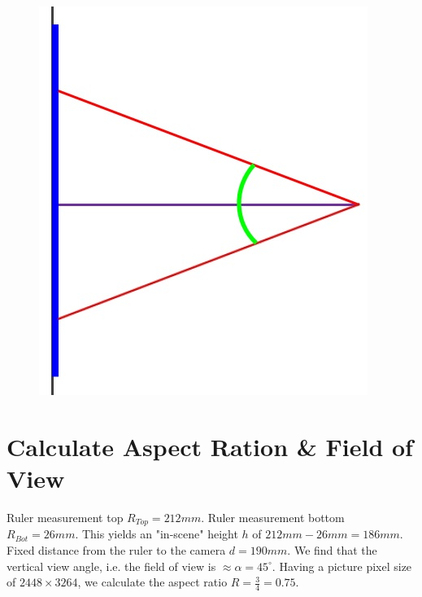 \documentclass[12pt]{article}
\begin{document}
\begin{figure}[!htb]
\begin{minipage}{.5\textwidth}
		\includegraphics[width=\linewidth]{figures/schema}
		\label{fig:Schema}
	\end{minipage}
\end{figure}

\section{Calculate Aspect Ration \& Field of View}

Ruler measurement top $R_{Top}=212mm$. Ruler measurement bottom  $R_{Bot}=26mm$. This yields an "in-scene" height $h$ of $212mm-26mm=186mm$. Fixed distance from the ruler to the camera $d=190mm$. We find that the vertical view angle, i.e. the field of view is $\approx\alpha=45^\circ$.
\newline\newline
Having a picture pixel size of $2448\times3264$, we calculate the aspect ratio $R=\frac{3}{4}=0.75$.
\end{document}
